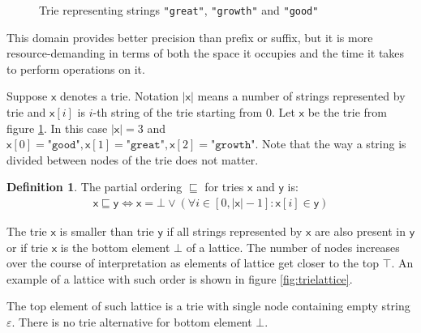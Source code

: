 \documentclass[12pt,final,oneside]{fithesis2}
\theoremstyle{definition}
\newtheorem{definition}{Definition}[chapter]
\begin{document}
\begin{figure}[ht]
\centering
{}
\caption{Trie representing strings \texttt{"great"}, \texttt{"growth"} and
  \texttt{"good"}}
\label{fig:trie}
\end{figure}

This domain provides better precision than prefix or suffix, but it is more
resource-demanding in terms of both the space it occupies and the time it
takes to perform operations on it.

Suppose $\mathsf{x}$ denotes a trie. Notation $|\mathsf{x}|$ means a number of
strings represented by trie and $\mathsf{x}[i]$ is $i$-th string of the trie
starting from 0. Let $\mathsf{x}$ be the trie from figure \ref{fig:trie}.
In this case $|\mathsf{x}| = 3$ and $\mathsf{x}[0] = \texttt{"good"},
\mathsf{x}[1] = \texttt{"great"}, \mathsf{x}[2] = \texttt{"growth"}$.
Note that the way a string is divided between nodes of the trie does not
matter. 

\begin{definition}
The partial ordering $\sqsubseteq$ for tries $\mathsf{x}$ and $\mathsf{y}$ is:
\begin{align*}
\mathsf{x} \sqsubseteq \mathsf{y} \Leftrightarrow
  \mathsf{x} = \bot \lor (\forall i \in [0, |\mathsf{x}| - 1] : \mathsf{x}[i] \in \mathsf{y})
\end{align*}
\end{definition}

The trie $\mathsf{x}$ is smaller than trie $\mathsf{y}$ if all strings
represented by $\mathsf{x}$ are also present in $\mathsf{y}$ or if trie
$\mathsf{x}$ is the bottom element $\bot$ of a lattice. The number of nodes
increases over the course of interpretation as elements of lattice get
closer to the top $\top$. An example of a lattice with such order is shown
in figure \ref{fig:trielattice}.

The top element of such lattice is a trie with single node containing empty
string $\varepsilon$. There is no trie alternative for bottom element $\bot$.
\end{document}
